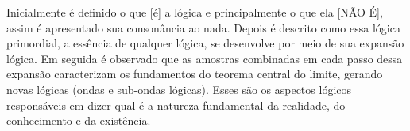 Inicialmente é definido o que [é] a lógica e principalmente o que ela [NÃO É], assim é apresentado sua consonância ao nada. Depois é descrito como essa lógica primordial, a essência de qualquer lógica, se desenvolve por meio de sua expansão lógica. Em seguida é observado que as amostras combinadas em cada passo dessa expansão caracterizam os fundamentos do teorema central do limite, gerando novas lógicas (ondas e sub-ondas lógicas). Esses são os aspectos lógicos responsáveis em dizer qual é a natureza fundamental da realidade, do conhecimento e da existência. 

\bigbreak
